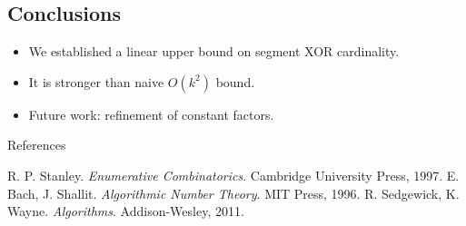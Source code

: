 \documentclass[handout,notheorems]{beamer}
\theoremstyle{definition}
\begin{document}
\subsection{Conclusions}

\begin{frame}
    \begin{itemize}
        \item We established a linear upper bound on segment XOR cardinality.
        \item It is stronger than naive $O(k^2)$ bound.
        \item Future work: refinement of constant factors.
    \end{itemize}
\end{frame}

\begin{frame}{References}
    \begin{thebibliography}{9}
         R. P. Stanley. \emph{Enumerative Combinatorics}. Cambridge University Press, 1997.
         E. Bach, J. Shallit. \emph{Algorithmic Number Theory}. MIT Press, 1996.
         R. Sedgewick, K. Wayne. \emph{Algorithms}. Addison-Wesley, 2011.
    \end{thebibliography}
\end{frame}
\end{document}
